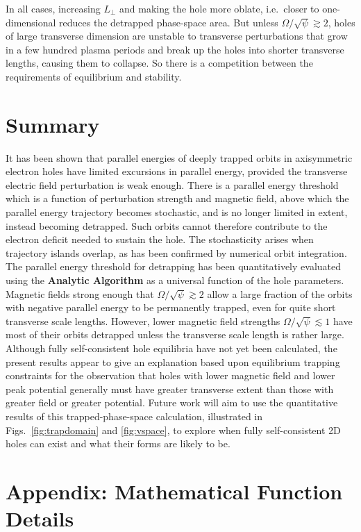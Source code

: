 \documentclass[draft,jgrga]{agutex}
\begin{document}
\begin{article}
In all cases, increasing $L_\perp$ and making the hole more oblate,
i.e.\ closer to one-dimensional reduces the detrapped phase-space
area. But unless $\Omega/\sqrt\psi\gtrsim 2$, holes of large
transverse dimension are unstable to transverse perturbations that
grow in a few hundred plasma periods and break up the holes into
shorter transverse lengths, causing them to collapse. So there is a
competition between the requirements of equilibrium and stability.


\section{Summary}

It has been shown that parallel energies of deeply trapped orbits in
axisymmetric electron holes have limited excursions in parallel
energy, provided the transverse electric field perturbation is weak
enough. There is a parallel energy threshold which is a function of
perturbation strength and magnetic field, above which the parallel
energy trajectory becomes stochastic, and is no longer limited in
extent, instead becoming detrapped. Such orbits cannot therefore
contribute to the electron deficit needed to sustain the hole. The
stochasticity arises when trajectory islands overlap, as has been
confirmed by numerical orbit integration. The parallel energy
threshold for detrapping has been quantitatively evaluated using the
\textbf{Analytic Algorithm} as a universal function of the hole
parameters. Magnetic fields strong enough that
$\Omega/\sqrt\psi\gtrsim 2$ allow a large fraction of the orbits with
negative parallel energy to be permanently trapped, even for quite
short transverse scale lengths. However, lower magnetic field
strengths $\Omega/\sqrt\psi\lesssim 1$ have most of their orbits
detrapped unless the transverse scale length is rather large. Although
fully self-consistent hole equilibria have not yet been calculated,
the present results appear to give an explanation based upon
equilibrium trapping constraints for the observation that holes with
lower magnetic field and lower peak potential generally must have
greater transverse extent than those with greater field or greater
potential. Future work will aim to use the quantitative results of
this trapped-phase-space calculation, illustrated in Figs.\
\ref{fig:trapdomain} and \ref{fig:vspace}, to explore when fully
self-consistent 2D holes can exist and what their forms are likely to
be.

\section*{Appendix: Mathematical Function Details}


\end{article}
\end{document}
